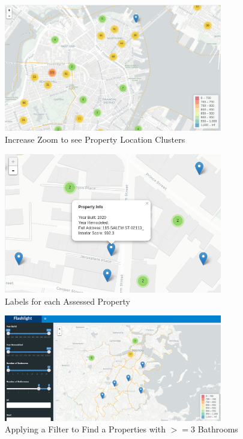 \documentclass[12pt]{article}
\begin{document}
\begin{figure}
  \caption{Increase Zoom to see Property Location Clusters}
  \centering
  \includegraphics[width=0.85\textwidth]{showing_clusters}
\end{figure}

\begin{figure}
  \caption{Labels for each Assessed Property}
  \centering
  \includegraphics[width=0.85\textwidth]{individual_point_label}
\end{figure}

\begin{figure}
  \caption{Applying a Filter to Find a Properties with $>= 3$ Bathrooms}
  \centering
  \includegraphics[width=0.85\textwidth]{bathroom_filter}
\end{figure}
\end{document}
